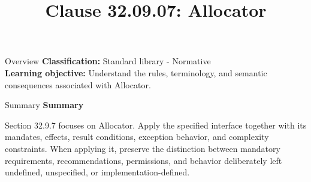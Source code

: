 \documentclass[10pt,letterpaper]{article}
\title{Clause 32.09.07: Allocator}
\author{}
\date{}
\begin{document}
\maketitle
\begin{CornellOverviewBox}{Overview}
\textbf{Classification:} Standard library - Normative\\[2pt]
\textbf{Learning objective:} Understand the rules, terminology, and semantic consequences associated with Allocator.
\end{CornellOverviewBox}\begin{CornellSummaryBox}{Summary}
{\sffamily\bfseries\color{Accent} Summary}\par\vspace{3pt}Section 32.9.7 focuses on Allocator. Apply the specified interface together with its mandates, effects, result conditions, exception behavior, and complexity constraints. When applying it, preserve the distinction between mandatory requirements, recommendations, permissions, and behavior deliberately left undefined, unspecified, or implementation-defined.
\end{CornellSummaryBox}
\end{document}
